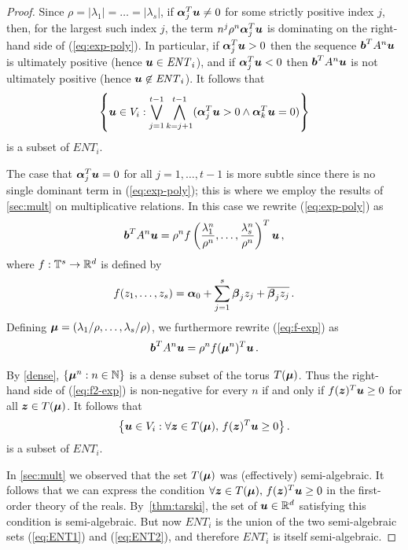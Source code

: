 \begin{proof}
Since $\rho=|\lambda_1|=\ldots=|\lambda_s|$, if
$\boldsymbol{\alpha}_j^T\boldsymbol{u}\neq 0$ for some strictly
positive index $j$, then, for the largest such index $j$, the term
$n^{j}\rho^n\boldsymbol{\alpha}_{j}^T\boldsymbol{u}$ is
dominating on the right-hand side of (\ref{eq:exp-poly}).  In
particular, if $\boldsymbol{\alpha}_{j}^T\boldsymbol{u}>0$ then the
sequence $\boldsymbol{b}^TA^n\boldsymbol{u}$ is ultimately positive
(hence $\boldsymbol{u}\in \mathit{ENT}_i$), and if
$\boldsymbol{\alpha}_{j}^T\boldsymbol{u}<0$ then
$\boldsymbol{b}^TA^n\boldsymbol{u}$ is not ultimately positive (hence
$\boldsymbol{u}\not\in\mathit{ENT}_i$).  It follows that
\begin{gather}
\left\lbrace \myvector{u} \in V_i : \bigvee_{j=1}^{t-1}\bigwedge_{k=j+1}^{t-1}
(\myvector{\alpha}_j^T \myvector{u}>0 \wedge
\myvector{\alpha}_k^T \myvector{u}=0) \right\rbrace
\label{eq:ENT1}
\end{gather}
is a subset of $\mathit{ENT}_i$.

The case that $\boldsymbol{\alpha}_j^T\boldsymbol{u}=0$ for all
$j=1,\ldots,t-1$ is more subtle since there is no single dominant term
in (\ref{eq:exp-poly}); this is where we employ the results of
\cref{sec:mult} on multiplicative relations. In this case we
rewrite (\ref{eq:exp-poly}) as
\begin{gather}
\myvector{b}^T A^n \myvector{u} =
 \rho^n f\left(\frac{\lambda^n_1}{\rho^n},\ldots,
               \frac{\lambda^n_s}{\rho^n}\right)^T \myvector{u} \, ,
\label{eq:f-exp}
\end{gather}
where $f:\mathbb{T}^s\rightarrow\mathbb{R}^{d}$ is defined by
\[f(z_1,\ldots,z_s)=\boldsymbol{\alpha}_0 + \sum_{j=1}^s \boldsymbol{\beta}_jz_j + \overline{\boldsymbol{\beta}_jz_j} \, .\]
Defining $\boldsymbol\mu=(\lambda_1/\rho,\ldots,\lambda_s/\rho)$, we furthermore rewrite (\ref{eq:f-exp}) as
\begin{gather}
\myvector{b}^T A^n \myvector{u} =
    \rho^n f(\myvector\mu^n)^T \myvector{u} \, .
\label{eq:f2-exp}
\end{gather}

By \cref{dense}, $\lbrace \boldsymbol\mu^n : n \in
\mathbb{N} \rbrace$ is a dense subset of the torus $T(\boldsymbol{\mu})$.
Thus the right-hand side of (\ref{eq:f2-exp}) is non-negative for
every $n$ if and only if $f(\boldsymbol{z})^T\boldsymbol{u}\geq 0$ for
all $\boldsymbol{z}\in T(\boldsymbol{\mu})$.  It follows that
\begin{gather} \big \lbrace \myvector{u}\in V_i :
\forall \myvector{z}\in T(\myvector{\mu}),\,
                              f(\myvector{z})^T\myvector{u}\geq 0
\big\rbrace\, .
\label{eq:ENT2}
\end{gather}
is a subset of $\mathit{ENT}_i$.

In \cref{sec:mult} we observed that the set
$T(\boldsymbol{\mu})$ was (effectively) semi-algebraic.  It follows
that we can express the condition $\forall \boldsymbol{z}\in
T(\boldsymbol{\mu}),\, f(\boldsymbol{z})^T\boldsymbol{u}\geq 0$ in the
first-order theory of the reals.
By~\cref{thm:tarski}, the set of $\boldsymbol{u}\in
\mathbb{R}^{d}$ satisfying this condition is semi-algebraic.  But now
$\mathit{ENT}_i$ is the union of the two semi-algebraic sets
(\ref{eq:ENT1}) and (\ref{eq:ENT2}), and therefore $\mathit{ENT}_i$ is
itself semi-algebraic.
\end{proof}

